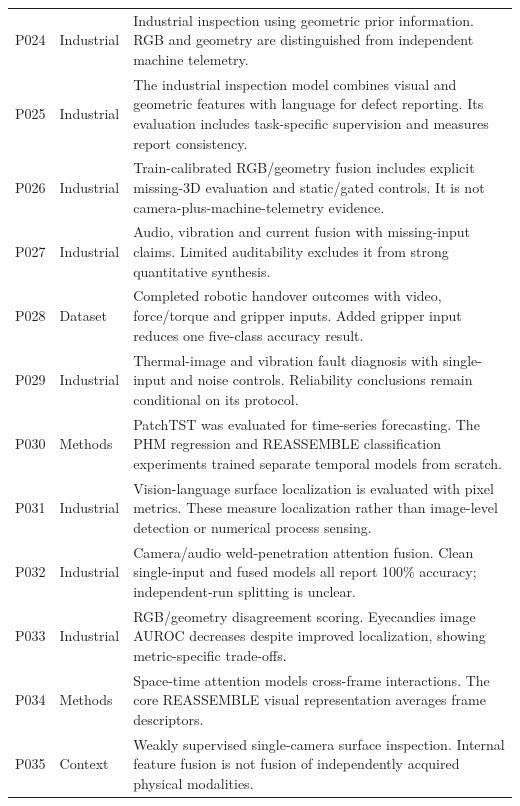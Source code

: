 \begin{longtable}{@{}P{.25\textwidth}P{.16\textwidth}P{.53\textwidth}@{}}
P024 \citep{P024} & Industrial & Industrial inspection using geometric prior
information. RGB and geometry are distinguished from independent machine telemetry. \\
P025 \citep{P025} & Industrial & The industrial inspection model combines visual and
geometric features with language for defect reporting. Its evaluation includes
task-specific supervision and measures report consistency. \\
P026 \citep{P026} & Industrial & Train-calibrated RGB/geometry fusion includes explicit
missing-3D evaluation and static/gated controls. It is not camera-plus-machine-telemetry
evidence. \\
P027 \citep{P027} & Industrial & Audio, vibration and current fusion with missing-input
claims. Limited auditability excludes it from strong quantitative synthesis. \\
P028 \citep{Thoduka2024Handover} & Dataset & Completed robotic handover outcomes with
video, force/torque and gripper inputs. Added gripper input reduces one five-class
accuracy result. \\
P029 \citep{Huo2022Multisensor} & Industrial & Thermal-image and vibration fault
diagnosis with single-input and noise controls. Reliability conclusions remain
conditional on its protocol. \\
P030 \citep{Nie2023PatchTST} & Methods & PatchTST was evaluated for time-series
forecasting. The PHM regression and REASSEMBLE classification experiments trained
separate temporal models from scratch. \\
P031 \citep{P031} & Industrial & Vision-language surface localization is evaluated with
pixel metrics. These measure localization rather than image-level detection or numerical
process sensing. \\
P032 \citep{Hua2026Weld} & Industrial & Camera/audio weld-penetration attention fusion.
Clean single-input and fused models all report 100\% accuracy; independent-run splitting
is unclear. \\
P033 \citep{P033} & Industrial & RGB/geometry disagreement scoring. Eyecandies image
AUROC decreases despite improved localization, showing metric-specific trade-offs. \\
P034 \citep{P034} & Methods & Space-time attention models cross-frame interactions. The
core REASSEMBLE visual representation averages frame descriptors. \\
P035 \citep{P035} & Context & Weakly supervised single-camera surface inspection.
Internal feature fusion is not fusion of independently acquired physical modalities. \\

\end{longtable}
